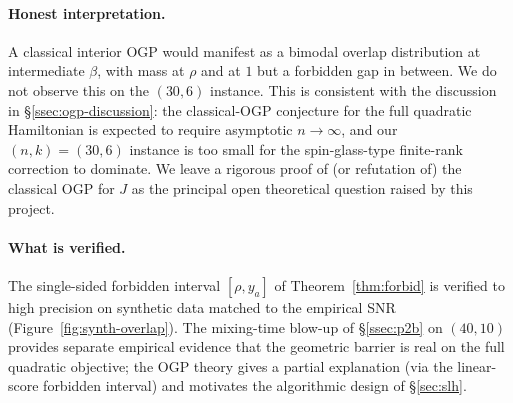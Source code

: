 \paragraph{Honest interpretation.} A classical interior OGP would manifest as a bimodal
overlap distribution at intermediate $\beta$, with mass at $\rho$ and at $1$ but a
forbidden gap in between. We do not observe this on the $(30,6)$ instance.
This is consistent with the discussion in \S\ref{ssec:ogp-discussion}: the classical-OGP
conjecture for the full quadratic Hamiltonian is expected to require asymptotic
$n\to\infty$, and our $(n,k)=(30,6)$ instance is too small for the spin-glass-type
finite-rank correction to dominate. We leave a rigorous proof of (or refutation of) the
classical OGP for $J$ as the principal open theoretical question raised by this project.

\paragraph{What is verified.} The single-sided forbidden interval
$[\rho, y_a]$ of Theorem~\ref{thm:forbid} is verified to high precision on synthetic data
matched to the empirical SNR (Figure~\ref{fig:synth-overlap}). The mixing-time blow-up
of \S\ref{ssec:p2b} on $(40,10)$ provides separate empirical evidence that the geometric
barrier is real on the full quadratic objective; the OGP theory gives a partial explanation
(via the linear-score forbidden interval) and motivates the algorithmic design of
\S\ref{sec:slh}.
